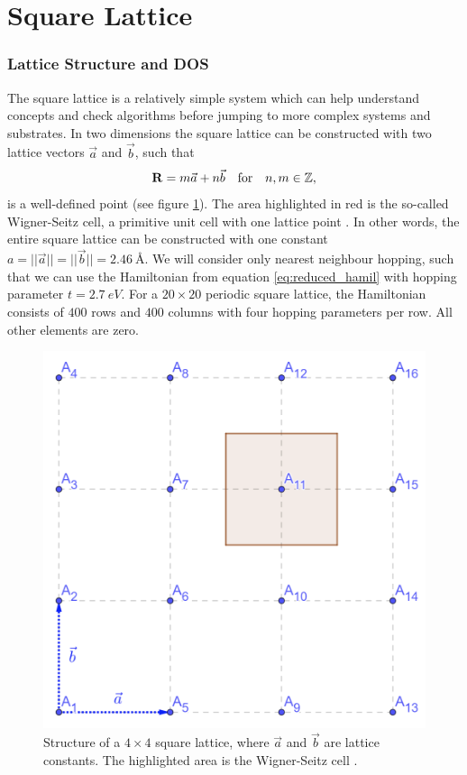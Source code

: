 
\section{Square Lattice}\label{square_lattice}

\subsubsection{Lattice Structure and DOS}

The square lattice is a relatively simple system which can help understand concepts and check algorithms before jumping to more complex systems and substrates. In two dimensions the square lattice can be constructed with two lattice vectors $\Vec{a}$ and $\Vec{b}$, such that
\begin{equation}
    \mathbf{R} = m\Vec{a} + n\Vec{b} \quad \mathrm{for} \quad n,m\in\mathbb{Z},
\end{equation}
is a well-defined point (see figure \ref{fig:square_lattice}). The area highlighted in red is the so-called Wigner-Seitz cell, a primitive unit cell with one lattice point \cite{Hofmann2015}. In other words, the entire square lattice can be constructed with one constant $a=||\Vec{a}||=||\Vec{b}||= \SI{2.46}{\angstrom}$. We will consider only nearest neighbour hopping, such that we can use the Hamiltonian from equation \ref{eq:reduced_hamil} with hopping parameter $t=\SI{2.7}{eV}$. For a $20\times 20$ periodic square lattice, the Hamiltonian consists of $400$ rows and $400$ columns with four hopping parameters per row. All other elements are zero. 

\begin{figure}[H]
    \centering
    \includegraphics[width=.4\textwidth]{img/squarelattice_structure.PNG}
    \caption{Structure of a $4\times 4$ square lattice, where $\Vec{a}$ and $\Vec{b}$ are lattice constants. The highlighted area is the Wigner-Seitz cell \cite{Hofmann2015}.}
    \label{fig:square_lattice}
\end{figure}

